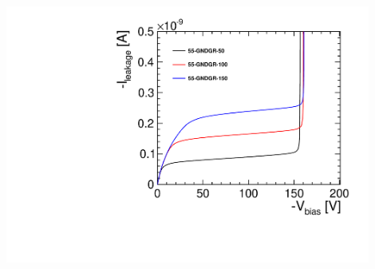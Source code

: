 \begin{frame}
\begin{columns}
    \includegraphics[width=0.9\textwidth]{../figures/ActiveEdge/IVCurve_TCAD_55_GNDGR.pdf}
  \end{columns}

\end{frame}

